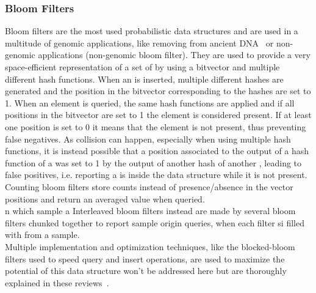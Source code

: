 \subsubsection{Bloom Filters}
Bloom filters are the most used probabilistic data structures and are used in a multitude of genomic applications, like removing from ancient DNA~\cite{akmerbroom} or non-genomic applications (non-genomic bloom filter). They are used to provide a very space-efficient representation of a set of \kmers by using a bitvector and multiple different hash functions. When an \kmer is inserted, multiple different hashes are generated and the position in the bitvector corresponding to the hashes are set to 1. When an element is queried, the same hash functions are applied and if all positions in the bitvector are set to 1 the element is considered present. If at least one position is set to 0 it means that the element is not present, thus preventing false negatives. As collision can happen, especially when using multiple hash functions, it is instead possible that a position associated to the output of a hash function of a \kmer was set to 1 by the output of another hash of another \kmer, leading to false positives, i.e. reporting a \kmer is inside the data structure while it is not present.\\
Counting bloom filters store counts instead of presence/absence in the vector positions and return an averaged value when queried.\\n which sample a 
Interleaved bloom filters instead are made by several bloom filters chunked together to report sample origin queries, when each filter si filled with \kmers from a sample.\\
Multiple implementation and optimization techniques, like the blocked-bloom filters used to speed query and insert operations, are used to maximize the potential of this data structure won't be addressed here but are thoroughly explained in these reviews~\cite{marchet2024kmersets,marchet2021kmer,marchet2024coloredkmersets}. 

